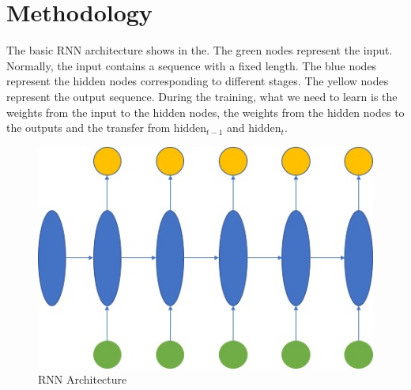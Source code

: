 \documentclass{article}
\begin{document}
\section{Methodology}
The basic RNN architecture shows in the. The green nodes represent the input. Normally, the input contains a sequence with a fixed length. The blue nodes represent the hidden nodes corresponding to different stages. The yellow nodes represent the output sequence. During the training, what we need to learn is the weights from the input to the hidden nodes, the weights from the hidden nodes to the outputs and the transfer from $\text{hidden}_{t-1}$ and $\text{hidden}_{t}$.
\begin{figure}[H]
\begin{center}
\includegraphics[scale=0.5]{image/RNN.jpg}
\end{center}
\caption{RNN Architecture}
\label{figure: RNN architecture}
\end{figure}
\end{document}
